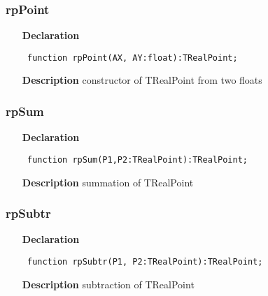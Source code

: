 \documentclass[12pt,a4paper,oneside]{report}
\newcommand{\declarationitem}[1]{\textbf{#1}}
\newcommand{\descriptiontitle}[1]{\textbf{#1}}
\newcommand{\code}[1]{\texttt{#1}}
\begin{document}
\subsubsection{rpPoint}
\label{uRealPoints-rpPoint}
\begin{itemize}\item[\declarationitem{Declaration}\hfill]
\begin{flushleft}
\code{
function rpPoint(AX, AY:float):TRealPoint;}

\end{flushleft}

\par
\item[\descriptiontitle{Description}]
constructor of TRealPoint from two floats

\end{itemize}
\subsubsection{rpSum}
\label{uRealPoints-rpSum}
\begin{itemize}\item[\declarationitem{Declaration}\hfill]
\begin{flushleft}
\code{
function rpSum(P1,P2:TRealPoint):TRealPoint;}

\end{flushleft}

\par
\item[\descriptiontitle{Description}]
summation of TRealPoint

\end{itemize}
\subsubsection{rpSubtr}
\label{uRealPoints-rpSubtr}
\begin{itemize}\item[\declarationitem{Declaration}\hfill]
\begin{flushleft}
\code{
function rpSubtr(P1, P2:TRealPoint):TRealPoint;}

\end{flushleft}

\par
\item[\descriptiontitle{Description}]
subtraction of TRealPoint

\end{itemize}
\end{document}
